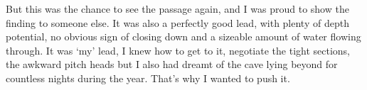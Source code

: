 But this was the chance to see the passage again, and I was proud to show the finding to someone else. It was also a perfectly good lead, with plenty of depth potential, no obvious sign of closing down and a sizeable amount of water flowing through. It was `my' lead, I knew how to get to it, negotiate the tight sections, the awkward pitch heads but I also had dreamt of the cave lying beyond for countless nights during the year. That's why I wanted to push it.

